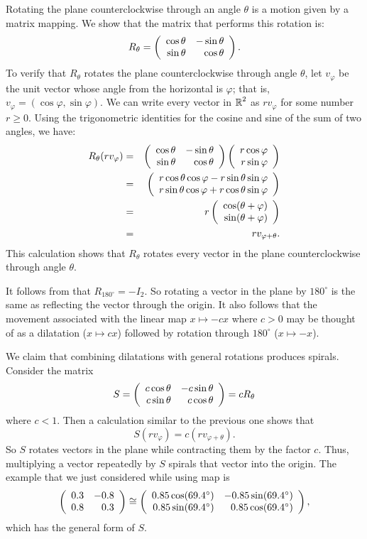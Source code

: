 \documentclass{ximera}
\begin{document}
Rotating the plane counterclockwise through an angle $\theta$ is
a motion given by a matrix mapping.  We show that the matrix that
performs this rotation is:
\begin{equation} \label{e:rotmat}
R_\theta = \left(\begin{array}{rr} \cos\theta & -\sin\theta\\ \sin\theta &\cos\theta\end{array}\right).
\end{equation}
To verify that $R_\theta$ rotates the plane counterclockwise
through angle $\theta$, let $v_\varphi$ be the unit vector whose
angle from the horizontal is $\varphi$; that is,
$v_\varphi=(\cos\varphi,\sin\varphi)$.  We can write every vector in
$\mbox{$\Bbb{R}$}^2$ as $rv_\varphi$ for some number $r\ge 0$.   Using the 
trigonometric identities for the cosine and sine of the sum of two angles, we
have:
\begin{eqnarray*}
R_\theta (rv_\varphi) & = &
\left(\begin{array}{rr} \cos\theta & -\sin\theta\\ \sin\theta &\cos\theta\end{array}\right)
\left(\begin{array}{r} r\cos\varphi \\ r\sin\varphi\end{array}\right) \\
& = & \left(\begin{array}{r} r\cos\theta\cos\varphi -r\sin\theta\sin\varphi \\ r\sin\theta\cos\varphi + r\cos\theta\sin\varphi\end{array}\right)\\
& = & r\left(\begin{array}{r} \cos(\theta+\varphi) \\ \sin(\theta+\varphi)\end{array}\right)  \\
& = & rv_{\varphi+\theta}.
\end{eqnarray*}
This calculation shows that $R_\theta$ rotates every vector in the plane
counterclockwise through angle $\theta$.

It follows from  that $R_{180^\circ} = -I_2$.  So rotating a
vector in the plane by $180^\circ$ is the same as reflecting the vector
through the origin.  It also follows that the movement associated with the
linear map $x\mapsto -cx$ where $c>0$ may be thought of as a dilatation
($x\mapsto cx$) followed by rotation through $180^\circ$ ($x\mapsto -x$).

We claim that combining dilatations with general rotations produces spirals.  
Consider the matrix
\[
S = \left(\begin{array}{rr} c\cos\theta & -c\sin\theta\\ c\sin\theta &c\cos\theta\end{array}\right) = cR_\theta
\]
where $c<1$.  Then a calculation similar to the previous one shows that
\[
S(rv_\varphi) = c(rv_{\varphi+\theta}).
\]
So $S$ rotates vectors in the plane while contracting them by
the factor $c$.  Thus, multiplying a vector repeatedly by $S$ 
spirals that vector into the origin.  The example that we just 
considered while using {\sf map} is
\[
\left(\begin{array}{rr} 0.3 & -0.8\\ 0.8 &0.3\end{array}\right)\cong\left(\begin{array}{rr} 0.85\cos(69.4^\circ) & -0.85\sin(69.4^\circ)\\ 0.85\sin(69.4^\circ) &0.85\cos(69.4^\circ)\end{array}\right),
\]
which has the general form of $S$.
\end{document}

